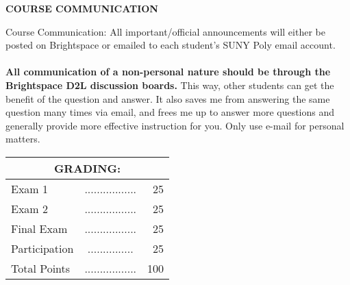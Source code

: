 \documentclass{article}
\begin{document}
\begin{center}
{\bf COURSE COMMUNICATION}
\end{center}
Course Communication: All important/official announcements will either be posted on Brightspace or emailed to each student's SUNY Poly email account.\\
\\
{\bf All communication of a non-personal nature should be through the Brightspace D2L discussion boards.}  This way, other students can get the benefit of the question and answer.  It also saves me from answering the same question many times via email, and frees me up to answer more questions and generally provide more effective instruction for you.  Only use e-mail for personal matters.   \\
\begin{center}
\begin{tabular}{lcr}
\multicolumn{3}{c}{\bf GRADING:} \\ \hline
Exam 1 & ................. & 25 \\

Exam 2 & ................. & 25 \\

Final Exam & ................. & 25 \\


Participation & ............... &  25\\
  



Total Points & ................. & 100\\
\end{tabular}
\end{center}
\end{document}

